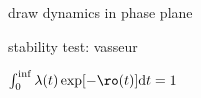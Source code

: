 draw dynamics in phase plane

stability test:
vasseur

$\int_{0}^{\inf} \lambda (t) \exp[-\ro (t)] \mathrm{d}t = 1$